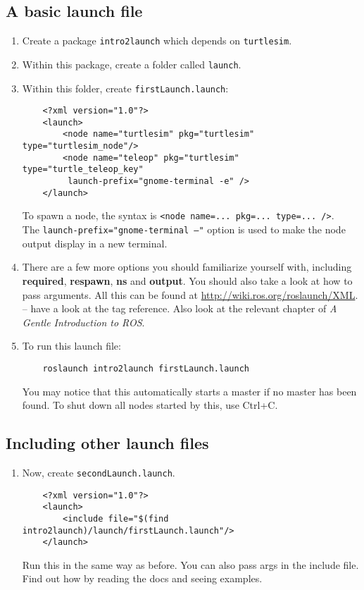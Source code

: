 \documentclass{article}
\begin{document}
        \subsection{A basic launch file}
        \begin{enumerate}
            \item Create a package \texttt{intro2launch} which depends on \texttt{turtlesim}.
            \item Within this package, create a folder called \texttt{launch}.
            \item Within this folder, create \texttt{firstLaunch.launch}:
            \begin{verbatim}
    <?xml version="1.0"?>
    <launch>
        <node name="turtlesim" pkg="turtlesim" type="turtlesim_node"/>
        <node name="teleop" pkg="turtlesim" type="turtle_teleop_key"
         launch-prefix="gnome-terminal -e" />
    </launch>
            \end{verbatim}
    
            To spawn a node, the syntax is \texttt{<node name=... pkg=... type=... />}.
            \\
            The \texttt{launch-prefix="gnome-terminal --"} option is used to make the node output
            display in a new terminal.
            \item There are a few more options you should familiarize yourself with, including 
            \textbf{required}, \textbf{respawn}, \textbf{ns} and \textbf{output}. You should 
            also take a look at how to pass arguments. All this can be found at \url{http://wiki.ros.org/roslaunch/XML}.
            -- have a look at the tag reference. Also look at the relevant chapter of \emph{A Gentle Introduction to ROS}.
            \item To run this launch file:
            \begin{verbatim}
    roslaunch intro2launch firstLaunch.launch
            \end{verbatim}
            You may notice that this automatically starts a master if no master has been found.
            To shut down all nodes started by this, use Ctrl+C.
        \end{enumerate}
        \subsection{Including other launch files}
        \begin{enumerate}
            \item Now, create \texttt{secondLaunch.launch}.
            \begin{verbatim}
    <?xml version="1.0"?>
    <launch>
        <include file="$(find intro2launch)/launch/firstLaunch.launch"/>
    </launch>
            \end{verbatim}
            Run this in the same way as before. You can also pass args in the include file. Find out 
            how by reading the docs and seeing examples.
        \end{enumerate}
\end{document}
